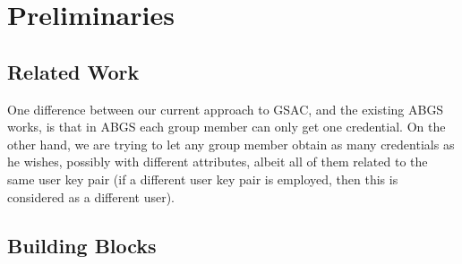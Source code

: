 \section{Preliminaries}
\label{sec:preliminaries}

\subsection{Related Work}
\label{ssec:related}


One difference between our current approach to GSAC, and the existing ABGS
works, is that in ABGS each group member can only get one credential. On the
other hand, we are trying to let any group member obtain as many credentials
as he wishes, possibly with different attributes, albeit all of them related to
the same user key pair (if a different user key pair is employed, then this is
considered as a different user). 

\subsection{Building Blocks}
\label{ssec:bblocks}

